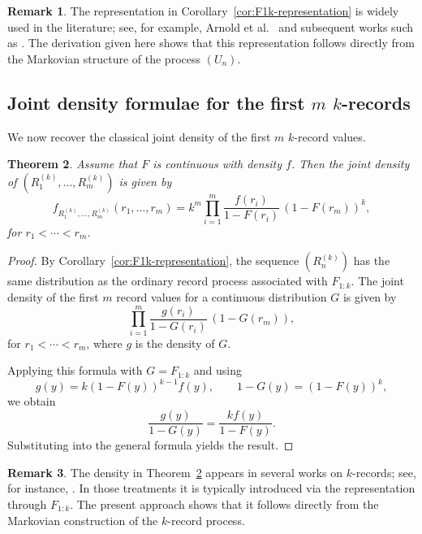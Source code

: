 \documentclass[12pt]{article}
\newtheorem{theorem}{Theorem}[section]
\theoremstyle{definition}
\newtheorem{remark}[theorem]{Remark}
\begin{document}
\begin{remark}
\label{rem:F1k-literature}
The representation in Corollary~\ref{cor:F1k-representation} is widely used in the literature; see, for example, Arnold et al.~\cite{ArnoldBalakrishnanNagaraja1998} and subsequent works such as \cite{HofmannBalakrishnan2004,AhmadiDoostparast2008}. The derivation given here shows that this representation follows directly from the Markovian structure of the process $(U_n)$.
\end{remark}

\subsection{Joint density formulae for the first $m$ $k$-records}
\label{subsec:joint-density}

We now recover the classical joint density of the first $m$ $k$-record values.

\begin{theorem}
\label{thm:joint-density-k-records}
Assume that $F$ is continuous with density $f$. Then the joint density of $(R_1^{(k)},\dots,R_m^{(k)})$ is given by
\[
f_{R_1^{(k)},\dots,R_m^{(k)}}(r_1,\dots,r_m)
=
k^m
\prod_{i=1}^m
\frac{f(r_i)}{1-F(r_i)}
\,(1-F(r_m))^k,
\]
for $r_1<\cdots<r_m$.
\end{theorem}

\begin{proof}
By Corollary~\ref{cor:F1k-representation}, the sequence $(R_n^{(k)})$ has the same distribution as the ordinary record process associated with $F_{1:k}$. The joint density of the first $m$ record values for a continuous distribution $G$ is given by
\[
\prod_{i=1}^m \frac{g(r_i)}{1-G(r_i)} \,(1-G(r_m)),
\]
for $r_1<\cdots<r_m$, where $g$ is the density of $G$.

Applying this formula with $G=F_{1:k}$ and using
\[
g(y)=k(1-F(y))^{k-1}f(y),
\qquad
1-G(y)=(1-F(y))^k,
\]
we obtain
\[
\frac{g(y)}{1-G(y)}
=
\frac{k f(y)}{1-F(y)}.
\]
Substituting into the general formula yields the result.
\end{proof}

\begin{remark}
\label{rem:joint-density-literature}
The density in Theorem~\ref{thm:joint-density-k-records} appears in several works on $k$-records; see, for instance, \cite{HofmannBalakrishnan2004,AhmadiDoostparast2008}. In those treatments it is typically introduced via the representation through $F_{1:k}$. The present approach shows that it follows directly from the Markovian construction of the $k$-record process.
\end{remark}
\end{document}
